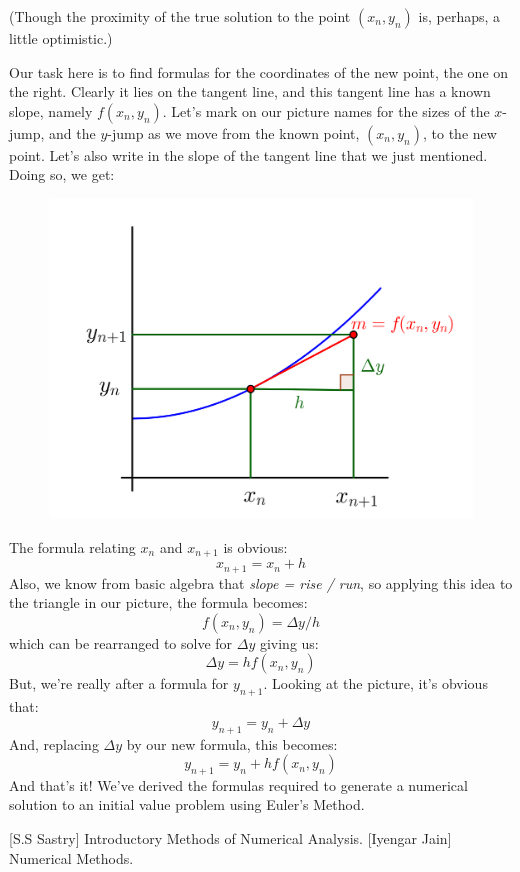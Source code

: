 \documentclass[leqno, 12pt]{article}
\begin{document}
(Though the proximity of the {\color{blue} true solution} to the {\color{red} point $(x_n, y_n)$} is, perhaps, a little optimistic.)

Our task here is to find formulas for the coordinates of the new point, the one on the right. Clearly it lies on the {\color{red}tangent line}, and this  {\color{red}tangent line} has a known slope, namely $f(x_n, y_n)$. Let's mark on our picture names for the sizes of the $x$-jump, and the $y$-jump as we move from the known point, $(x_n, y_n)$, to the new point. Let's also write in the slope of the  {\color{red}tangent line} that we just mentioned. Doing so, we get:

\begin{figure}[hbt!]
\centering
\includegraphics[width=.55\textwidth]{Eulermethod2.png}
\end{figure}

The formula relating $x_n$ and $x_{n+1}$ is obvious:
\[x_{n+1}  = x_n  + h\]
Also, we know from basic algebra that \textit{slope = rise / run}, so applying this idea to the triangle in our picture, the formula becomes:
\[f(x_n, y_n )= \Delta y / h\]
which can be rearranged to solve for $\Delta y$ giving us:
\[\Delta y = h f(x_n, y_n)\]
But, we're really after a formula for $y_{n+1}$. Looking at the picture, it's obvious that:
\[y_{n+1}= y_n  + \Delta y\]
And, replacing $\Delta y$ by our new formula, this becomes:
\[y_{n+1}= y_n + h f(x_n, y_n)\]
And that's it! We've derived the formulas required to generate a numerical solution to an initial value problem using Euler's Method.

\newpage

 \begin{thebibliography}{9}
[S.S Sastry] Introductory Methods of Numerical Analysis.
[Iyengar Jain] Numerical Methods.
\end{thebibliography}
\end{document}
